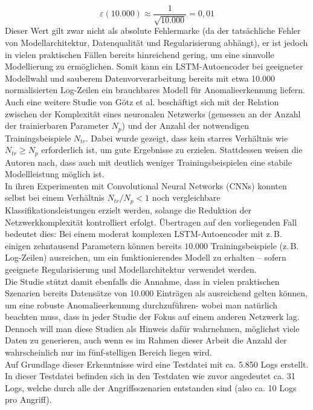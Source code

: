 \documentclass[a4paper,12pt]{article}
\begin{document}
	\[
	\varepsilon(10.000) \approx \frac{1}{\sqrt{10.000}} = 0{,}01
	\]
	Dieser Wert gilt zwar nicht als absolute Fehlermarke (da der tatsächliche Fehler von Modellarchitektur, Datenqualität und Regularisierung abhängt), er ist jedoch in vielen praktischen Fällen bereits hinreichend gering, um eine sinnvolle Modellierung zu ermöglichen. Somit kann ein LSTM-Autoencoder bei geeigneter Modellwahl und sauberem Datenvorverarbeitung bereits mit etwa 10.000 normalisierten Log-Zeilen ein brauchbares Modell für Anomalieerkennung liefern.
	\\[0.5em]
	Auch eine weitere Studie von Götz et al. \cite{Goetz2023} beschäftigt sich mit der Relation zwischen der Komplexität eines neuronalen Netzwerks (gemessen an der Anzahl der trainierbaren Parameter \( N_p \)) und der Anzahl der notwendigen Trainingsbeispiele \( N_{tr} \). Dabei wurde gezeigt, dass kein starres Verhältnis wie \( N_{tr} \geq N_p \) erforderlich ist, um gute Ergebnisse zu erzielen. Stattdessen weisen die Autoren nach, dass auch mit deutlich weniger Trainingsbeispielen eine stabile Modellleistung möglich ist.
	\\[0.5em]
	In ihren Experimenten mit Convolutional Neural Networks (CNNs) konnten selbst bei einem Verhältnis \( N_{tr}/N_p < 1 \) noch vergleichbare Klassifikationsleistungen erzielt werden, solange die Reduktion der Netzwerkkomplexität kontrolliert erfolgt. Übertragen auf den vorliegenden Fall bedeutet dies: Bei einem moderat komplexen LSTM-Autoencoder mit z.\,B. einigen zehntausend Parametern können bereits $10.000$ Trainingsbeispiele (z.\,B. Log-Zeilen) ausreichen, um ein funktionierendes Modell zu erhalten – sofern geeignete Regularisierung und Modellarchitektur verwendet werden. 
	\\[0.5em]
	Die Studie stützt damit ebenfalls die Annahme, dass in vielen praktischen Szenarien bereits Datensätze von 10.000 Einträgen als ausreichend gelten können, um eine robuste Anomalieerkennung durchzuführen- wobei man natürlich beachten muss, dass in jeder Studie der Fokus auf einem anderen Netzwerk lag. Dennoch will man diese Studien als Hinweis dafür wahrnehmen, möglichst viele Daten zu generieren, auch wenn es im Rahmen dieser Arbeit die Anzahl der wahrscheinlich nur im fünf-stelligen Bereich liegen wird.
	\\[0.5em]
	Auf Grundlage dieser Erkenntnisse wird eine Testdatei mit ca. 5.850 Logs erstellt.
	\\[0.5em]
	In dieser Testdatei befinden sich in den Testdaten wie zuvor angedeutet ca. 31 Logs, welche durch alle der Angriffsszenarien entstanden sind (also ca. 10 Logs pro Angriff).
	
\end{document}
